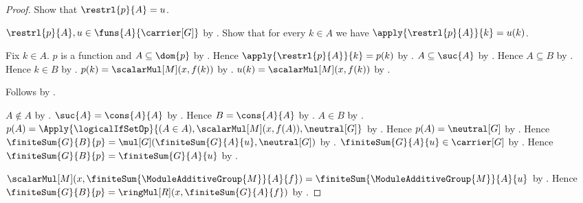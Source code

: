 \begin{proof}
    Show that $\restrl{p}{A}=u$.
    \begin{subproof}
        $\restrl{p}{A},u\in\funs{A}{\carrier[G]}$ by
            .
        Show that for every $k\in A$ we have
            $\apply{\restrl{p}{A}}{k}=u(k)$.
        \begin{subproof}
            Fix $k\in A$.
            $p$ is a function and $A\subseteq\dom{p}$ by
                .
            Hence $\apply{\restrl{p}{A}}{k}=p(k)$ by
                .
            $A\subseteq\suc{A}$ by .
            Hence $A\subseteq B$ by \auto.
            Hence $k\in B$ by .
            $p(k)=\scalarMul[M](x,f(k))$ by
                .
            $u(k)=\scalarMul[M](x,f(k))$ by
                .
        \end{subproof}
        Follows by
            .
    \end{subproof}
    $A\notin A$ by .
    $\suc{A}=\cons{A}{A}$ by .
    Hence $B=\cons{A}{A}$ by \auto.
    $A\in B$ by .
    $p(A)=\Apply{\logicalIfSetOp}{
        (A\in A),\scalarMul[M](x,f(A)),\neutral[G]}$ by
        .
    Hence $p(A)=\neutral[G]$ by
        .
    Hence
        $\finiteSum{G}{B}{p}
            =\mul[G](\finiteSum{G}{A}{u},\neutral[G])$ by
        .
    $\finiteSum{G}{A}{u}\in\carrier[G]$ by
        .
    Hence
        $\finiteSum{G}{B}{p}=\finiteSum{G}{A}{u}$ by
        .

    $\scalarMul[M](x,\finiteSum{\ModuleAdditiveGroup{M}}{A}{f})
        =\finiteSum{\ModuleAdditiveGroup{M}}{A}{u}$ by
        .
    Hence
        $\finiteSum{G}{B}{p}
            =\ringMul[R](x,\finiteSum{G}{A}{f})$ by
        \auto.


\end{proof}
